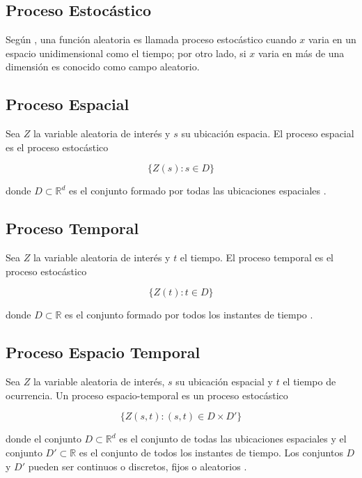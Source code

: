 \documentclass[
]{book}
\begin{document}
\hypertarget{proceso-estocuxe1stico}{%
\subsection{Proceso Estocástico}\label{proceso-estocuxe1stico}}

Según \citep{GeoJean}, una función aleatoria es llamada proceso estocástico cuando \(x\) varia en un espacio unidimensional como el tiempo; por otro lado, si \(x\) varia en más de una dimensión es conocido como campo aleatorio.

\hypertarget{proceso-espacial}{%
\subsection{Proceso Espacial}\label{proceso-espacial}}

Sea \(Z\) la variable aleatoria de interés y \(s\) su ubicación espacia. El proceso espacial es el proceso estocástico

\[\{Z(s):s \in D\}\]

donde \(D \subset \mathbb{R}^d\) es el conjunto formado por todas las ubicaciones espaciales \citep{marta}.

\hypertarget{proceso-temporal}{%
\subsection{Proceso Temporal}\label{proceso-temporal}}

Sea \(Z\) la variable aleatoria de interés y \(t\) el tiempo. El proceso temporal es el proceso estocástico

\[\{Z(t):t \in D\}\]

donde \(D \subset \mathbb{R}\) es el conjunto formado por todos los instantes de tiempo \citep{marta}.

\hypertarget{proceso-espacio-temporal}{%
\subsection{Proceso Espacio Temporal}\label{proceso-espacio-temporal}}

Sea \(Z\) la variable aleatoria de interés, \(s\) su ubicación espacial y \(t\) el tiempo de ocurrencia. Un proceso espacio-temporal es un proceso estocástico

\[\{Z(s,t):(s,t) \in D \times D' \}\]

donde el conjunto \(D \subset \mathbb{R}^d\) es el conjunto de todas las ubicaciones espaciales y el conjunto \(D' \subset \mathbb{R}\) es el conjunto de todos los instantes de tiempo. Los conjuntos \(D\) y \(D'\) pueden ser continuos o discretos, fijos o aleatorios \citep{marta}.
\end{document}
